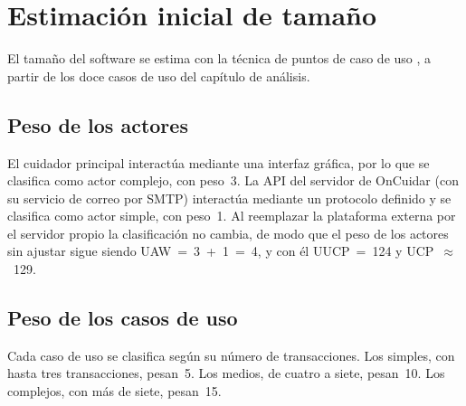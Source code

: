 \section[Estimación Inicial de Tamaño]{Estimación inicial de tamaño}

El tamaño del software se estima con la técnica de puntos de caso de uso
\citep{pressman_2010}, a partir de los doce casos de uso del capítulo de
análisis.

\subsection*{Peso de los actores}

El cuidador principal interactúa mediante una interfaz gráfica, por lo que se
clasifica como actor complejo, con peso~3. La API del servidor de OnCuidar (con su
servicio de correo por SMTP) interactúa mediante un protocolo definido y se
clasifica como actor simple, con peso~1. Al reemplazar la plataforma externa
por el servidor propio la clasificación no cambia, de modo que el peso de los
actores sin ajustar sigue siendo UAW~=~3~+~1~=~4, y con él UUCP~=~124 y
UCP~$\approx$~129.

\subsection*{Peso de los casos de uso}

Cada caso de uso se clasifica según su número de transacciones. Los simples,
con hasta tres transacciones, pesan~5. Los medios, de cuatro a siete, pesan~10.
Los complejos, con más de siete, pesan~15.

